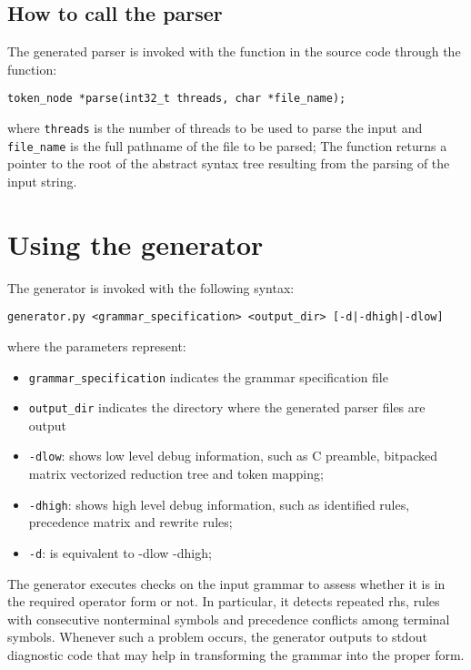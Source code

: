 \documentclass[a4paper,10pt]{article}
\begin{document}
\subsection{How to call the parser}

The generated parser is invoked with the function in the source code through the function:

\begin{verbatim}
token_node *parse(int32_t threads, char *file_name);
\end{verbatim}

where \texttt{threads} is the number of threads to be used to parse the input and \texttt{file\_name} is the full pathname of the file to be parsed;
The function returns a pointer to the root of the abstract syntax tree resulting from the parsing of the input string. \textbf{}

\section{Using the generator}

The generator is invoked with the following syntax:\\
\begin{verbatim}
generator.py <grammar_specification> <output_dir> [-d|-dhigh|-dlow]
 \end{verbatim}

where the parameters represent:
\begin{itemize}
 \item  \texttt{grammar\_specification} indicates the grammar specification file
 \item  \texttt{output\_dir} indicates the directory where the generated parser files are output
 \item  \texttt{-dlow}: shows low level debug information, such as C preamble, bitpacked matrix vectorized reduction tree and token mapping;
 \item  \texttt{-dhigh}: shows high level debug information, such as identified rules, precedence matrix and rewrite rules;
 \item  \texttt{-d}: is equivalent to -dlow -dhigh;
\end{itemize}
The generator executes checks on the input grammar to assess whether it is in
the required operator form or not. In particular, it detects repeated rhs,
rules with consecutive nonterminal symbols and precedence conflicts among
terminal symbols. Whenever such a problem occurs, the generator outputs to
stdout diagnostic code that may help in transforming the grammar into the proper
form.
\end{document}
